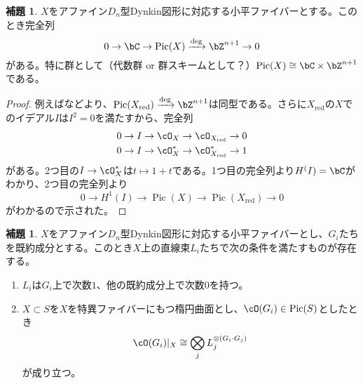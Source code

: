 \documentclass[uplatex, a4paper, dvipdfmx]{jsarticle}
\theoremstyle{definition}
\newtheorem{lemma}[theorem]{補題}
\DeclareMathOperator{\Pic}{\mathrm{Pic}}
\DeclareMathOperator{\red}{\mathrm{red}}
\begin{document}
\begin{lemma}\label{lem:picard-group-of-type-d}
    $X$をアファイン$D_n$型Dynkin図形に対応する小平ファイバーとする。このとき完全列
    \begin{equation}
        0 \to \bC \to \Pic(X) \xrightarrow{\deg} \bZ^{n+1} \to 0
    \end{equation}
    がある。特に群として（代数群 or 群スキームとして？）$\Pic(X) \cong \bC \times \bZ^{n+1}$である。
\end{lemma}
\begin{proof}
    例えば\cite{MR3713873}などより、$\Pic(X_{\red})  \xrightarrow{\deg} \bZ^{n+1}$は同型である。さらに$X_{\red}$の$X$でのイデアル$I$は$I^2 = 0$を満たすから、完全列
    \begin{align}
        0 \to I \to \cO_{X} \to \cO_{X_{\red}} \to 0 \\
        0 \to I \to \cO_{X}^* \to \cO_{X_{\red}}^* \to 1
    \end{align}
    がある。2つ目の$I \to \cO_{X}^*$は$t \mapsto 1 + t$である。1つ目の完全列より$H^(I) = \bC$がわかり、2つ目の完全列より
    \begin{equation}
        0 \to H^1(I) \to \Pic(X) \to \Pic(X_{\red}) \to 0
    \end{equation}
    がわかるので示された。
\end{proof}
\begin{lemma}\label{lem:special-line-bundles}
    $X$をアファイン$D_n$型Dynkin図形に対応する小平ファイバーとし、$G_i$たちを既約成分とする。このとき$X$上の直線束$L_i$たちで次の条件を満たすものが存在する。
    \begin{enumerate}
        \item $L_i$は$G_i$上で次数$1$、他の既約成分上で次数$0$を持つ。
        \item $X \subset S$を$X$を特異ファイバーにもつ楕円曲面とし、$\cO(G_i) \in \Pic(S)$としたとき
              \begin{equation}
                  \cO(G_i)\vert_X \cong \bigotimes_j L_j^{\otimes (G_i\cdot G_j)}
              \end{equation}
              が成り立つ。
    \end{enumerate}
\end{lemma}
\end{document}
